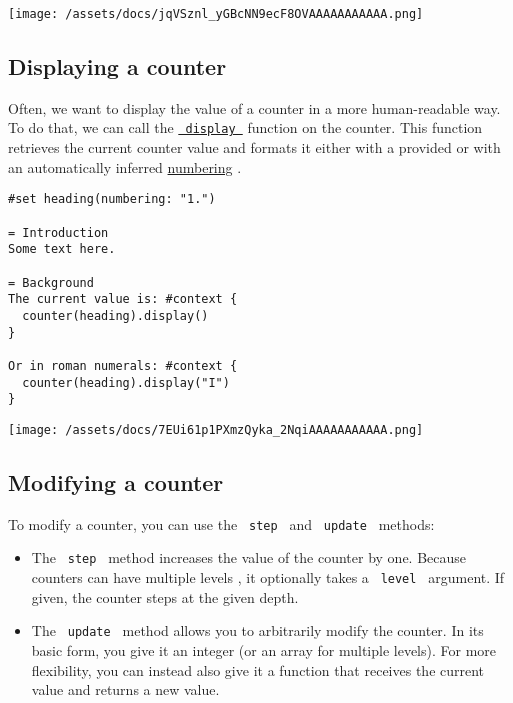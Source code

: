 \texttt{[image: /assets/docs/jqVSznl\_yGBcNN9ecF8OVAAAAAAAAAAA.png]}

\subsection{Displaying a counter}\label{displaying}

Often, we want to display the value of a counter in a more
human-readable way. To do that, we can call the
\href{/docs/reference/introspection/counter/\#definitions-display}{\texttt{\ display\ }}
function on the counter. This function retrieves the current counter
value and formats it either with a provided or with an automatically
inferred \href{/docs/reference/model/numbering/}{numbering} .

\begin{verbatim}
#set heading(numbering: "1.")

= Introduction
Some text here.

= Background
The current value is: #context {
  counter(heading).display()
}

Or in roman numerals: #context {
  counter(heading).display("I")
}
\end{verbatim}

\texttt{[image: /assets/docs/7EUi61p1PXmzQyka\_2NqiAAAAAAAAAAA.png]}

\subsection{Modifying a counter}\label{modifying}

To modify a counter, you can use the \texttt{\ step\ } and
\texttt{\ update\ } methods:

\begin{itemize}
\item
  The \texttt{\ step\ } method increases the value of the counter by
  one. Because counters can have multiple levels , it optionally takes a
  \texttt{\ level\ } argument. If given, the counter steps at the given
  depth.
\item
  The \texttt{\ update\ } method allows you to arbitrarily modify the
  counter. In its basic form, you give it an integer (or an array for
  multiple levels). For more flexibility, you can instead also give it a
  function that receives the current value and returns a new value.
\end{itemize}

